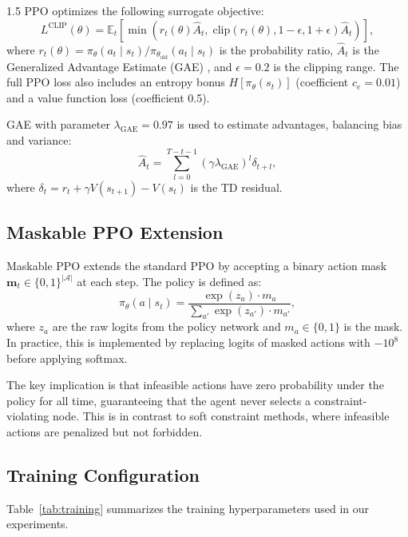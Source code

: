 \documentclass[A4paper,12pt]{report}
\theoremstyle{plain}
\theoremstyle{definition}
\theoremstyle{remark}
\numberwithin{equation}{section}
\begin{document}
\begin{spacing}{1.5}
PPO \cite{schulman2017} optimizes the following surrogate objective:
\begin{equation}
L^{\text{CLIP}}(\theta) = \mathbb{E}_t\!\left[\min\!\left(r_t(\theta)\hat{A}_t,\; \text{clip}(r_t(\theta), 1-\epsilon, 1+\epsilon)\hat{A}_t\right)\right],
\end{equation}
where $r_t(\theta) = \pi_\theta(a_t \mid s_t) / \pi_{\theta_{\text{old}}}(a_t \mid s_t)$ is the probability ratio, $\hat{A}_t$ is the Generalized Advantage Estimate (GAE) \cite{schulman2016}, and $\epsilon = 0.2$ is the clipping range. The full PPO loss also includes an entropy bonus $H[\pi_\theta(s_t)]$ (coefficient $c_e = 0.01$) and a value function loss (coefficient 0.5).

GAE with parameter $\lambda_{\text{GAE}} = 0.97$ is used to estimate advantages, balancing bias and variance:
\begin{equation}
\hat{A}_t = \sum_{l=0}^{T-t-1} (\gamma \lambda_{\text{GAE}})^l \delta_{t+l},
\end{equation}
where $\delta_t = r_t + \gamma V(s_{t+1}) - V(s_t)$ is the TD residual.

\subsection{Maskable PPO Extension}

Maskable PPO \cite{sb3contrib2021} extends the standard PPO by accepting a binary action mask $\mathbf{m}_t \in \{0,1\}^{|\mathcal{A}|}$ at each step. The policy is defined as:
\begin{equation}
\pi_\theta(a \mid s_t) = \frac{\exp(z_a) \cdot m_a}{\sum_{a'} \exp(z_{a'}) \cdot m_{a'}},
\end{equation}
where $z_a$ are the raw logits from the policy network and $m_a \in \{0,1\}$ is the mask. In practice, this is implemented by replacing logits of masked actions with $-10^8$ before applying softmax.

The key implication is that infeasible actions have zero probability under the policy for all time, guaranteeing that the agent never selects a constraint-violating node. This is in contrast to soft constraint methods, where infeasible actions are penalized but not forbidden.

\subsection{Training Configuration}

Table~\ref{tab:training} summarizes the training hyperparameters used in our experiments.


\end{spacing}
\end{document}
